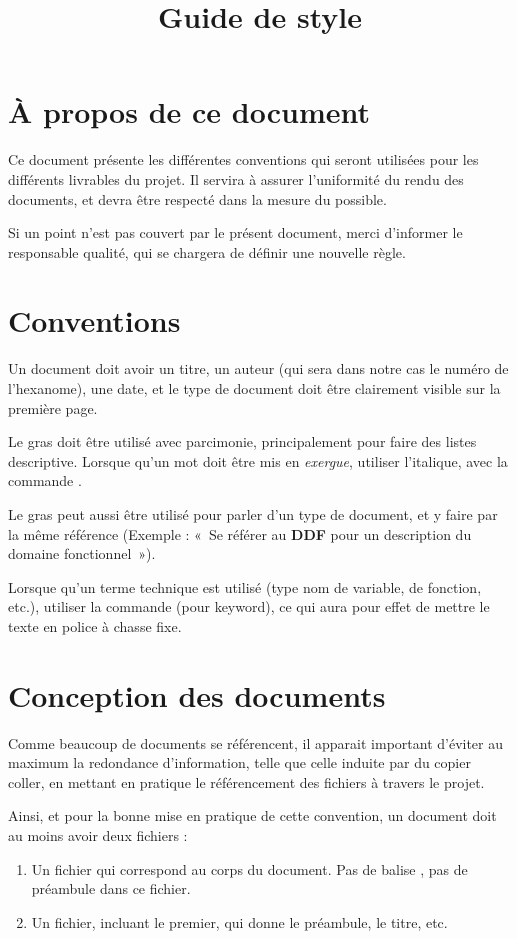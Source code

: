 

\title{Guide de style}


\maketitle
\section{À propos de ce document}
Ce document présente les différentes conventions qui seront utilisées pour les
différents livrables du projet. Il servira à assurer l'uniformité du rendu des
documents, et devra être respecté dans la mesure du possible.

Si un point n'est pas couvert par le présent document, merci d'informer le
responsable qualité, qui se chargera de définir une nouvelle règle.

\section{Conventions}
Un document doit avoir un titre, un auteur (qui sera dans notre cas le numéro
de l'hexanome), une date, et le type de document doit être clairement visible
sur la première page.

Le gras doit être utilisé avec parcimonie, principalement pour faire des listes
descriptive. Lorsque qu'un mot doit être mis en \emph{exergue}, utiliser l'italique,
avec la commande .

Le gras peut aussi être utilisé pour parler d'un type de document, et y faire
par la même référence (Exemple : «~Se référer au \textbf{DDF} pour un
description du domaine fonctionnel~»).

Lorsque qu'un terme technique est utilisé (type nom de variable, de fonction,
etc.), utiliser la commande  (pour keyword), ce qui aura pour effet de
mettre le texte en police à chasse fixe.

\section{Conception des documents}
Comme beaucoup de documents se référencent, il apparait important d'éviter au
maximum la redondance d'information, telle que celle induite par du copier
coller, en mettant en pratique le référencement des fichiers à travers le
projet.

Ainsi, et pour la bonne mise en pratique de cette convention, un document doit
au moins avoir deux fichiers :
\begin{enumerate}
    \item Un fichier qui correspond au corps du document. Pas de balise
    , pas de préambule dans ce fichier.
    \item Un fichier, incluant le premier, qui donne le préambule, le titre,
    etc.
\end{enumerate}	

